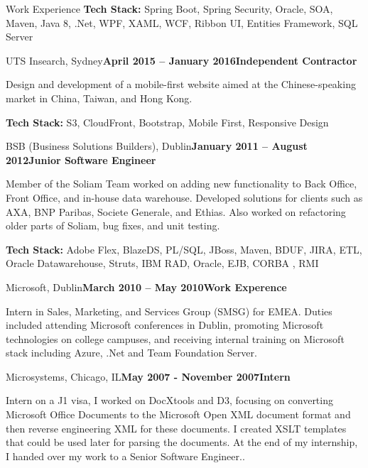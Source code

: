 \documentclass{résumé}
\begin{document}
\begin{rSection}{Work Experience}
\textbf{Tech Stack:} \normalfont Spring Boot, Spring Security, Oracle, SOA, Maven, Java 8, .Net, WPF, XAML, WCF, Ribbon UI, Entities Framework, SQL Server\\

\begin{rSubsection}{UTS Insearch, Sydney}{\textbf{April 2015 – January 2016}}{\textbf{Independent Contractor}}{}
 \item \normalfont Design and development of a mobile-first website aimed at the Chinese-speaking market in China, Taiwan, and Hong Kong.
\end{rSubsection}

\textbf{Tech Stack:} \normalfont S3, CloudFront, Bootstrap, Mobile First, Responsive Design
\pagebreak

\begin{rSubsection}{BSB (Business Solutions Builders), Dublin}{\textbf{January 2011 – August 2012}}{\textbf{Junior Software Engineer}}{}
 \item \normalfont Member of the Soliam Team worked on adding new functionality to Back Office, Front Office, and in-house data warehouse. Developed solutions for clients such as AXA, BNP Paribas, Societe Generale, and Ethias. Also worked on refactoring older parts of Soliam, bug fixes, and unit testing.
\end{rSubsection}

\textbf{Tech Stack:} \normalfont Adobe Flex, BlazeDS, PL/SQL, JBoss, Maven, BDUF, JIRA, ETL, Oracle Datawarehouse, Struts, IBM RAD, Oracle, EJB, CORBA , RMI \\

\begin{rSubsection}{Microsoft, Dublin}{\textbf{March 2010 – May 2010}}{\textbf{Work Experence}}{}
 \item \normalfont Intern in Sales, Marketing, and Services Group (SMSG) for EMEA. Duties included attending Microsoft conferences in Dublin, promoting Microsoft technologies on college campuses, and receiving internal training on Microsoft stack including Azure, .Net and Team Foundation Server.
\end{rSubsection}

\begin{rSubsection}{Microsystems, Chicago, IL}{\textbf{May 2007 - November 2007}}{\textbf{Intern}}{}
 \item \normalfont Intern on a J1 visa, I worked on DocXtools and D3, focusing on converting Microsoft Office Documents to the Microsoft Open XML document format and then reverse engineering XML for these documents. I created XSLT templates that could be used later for parsing the documents. At the end of my internship, I handed over my work to a Senior Software Engineer..
\end{rSubsection}


\end{rSection}
\end{document}
